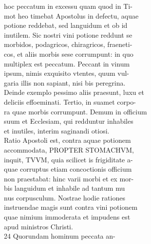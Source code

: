 \documentclass{article}
\begin{document}
\begin{pages}
                hoc peccatum in excessu quam quod in Ti- \\
                mot heo timebat Apostolus in defectu, aquae \\
                potione reddebat, sed languidum et ob id \\
                inutilem. Sic nostri vini potione reddunt se \\
                morbidos, podagricos, chiragricos, fraeneti- \\
                cos, et aliis morbis sese corrumpunt: in quo \\
                multiplex est peccatum. Peccant in vinum \\
                ipsum, nimis exquisito vtentes, quum vul- \\
                garia illis non sapiant, nisi bis peregrina. \\
                Deinde exemplo pessimo aliis praesunt, luxu et \\
                deliciis effoeminati. Tertio, in suamet corpo- \\
                ra quae morbis corrumpunt. Demum in officium \\
                suum et Ecclesiam, qui redduntur inhabiles \\
                et inutiles, interim saginandi otiosi. \\
                Ratio Apostoli est, contra aquae potionem \\
                accommodata, PROPTER STOMACHVM, \\
                inquit, TVVM, quia scilicet is frigiditate a- \\
                quae corruptus etiam concoctionis officium \\
                non praestabat: hinc varii morbi et ex mor- \\
                bis languidum et inhabile ad tantum mu \\
                nus corpusculum. Nostrae hodie rationes \\
                instruendae magis sunt contra vini potionem \\
                quae nimium immoderata et impudens est \\
                apud ministros Christi. \\
                24 Quorundam hominum peccata an- \\

\end{pages}
\end{document}
